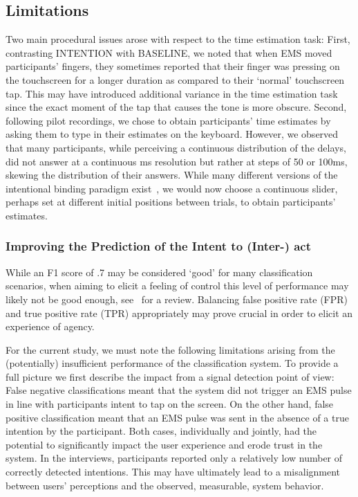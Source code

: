 \subsection{Limitations}
Two main procedural issues arose with respect to the time estimation task: First, contrasting INTENTION with BASELINE, we noted that when EMS moved participants' fingers, they sometimes reported that their finger was pressing on the touchscreen for a longer duration as compared to their `normal' touchscreen tap. This may have introduced additional variance in the time estimation task since the exact moment of the tap that causes the tone is more obscure. Second, following pilot recordings, we chose to obtain participants' time estimates by asking them to type in their estimates on the keyboard. However, we observed that many participants, while perceiving a continuous distribution of the delays, did not answer at a continuous ms resolution but rather at steps of 50 or 100ms, skewing the distribution of their answers. While many different versions of the intentional binding paradigm exist~\cite{Moore2012-dk}, we would now choose a continuous slider, perhaps set at different initial positions between trials, to obtain participants' estimates.

\subsubsection{Improving the Prediction of the Intent to (Inter-) act}
While an F1 score of .7 may be considered `good' for many classification scenarios, when aiming to elicit a feeling of control this level of performance may likely not be good enough, see~\citet{Papenmeier2022-oi} for a review. Balancing false positive rate (FPR) and true positive rate (TPR) appropriately may prove crucial in order to elicit an experience of agency.

For the current study, we must note the following limitations arising from the (potentially) insufficient performance of the classification system. To provide a full picture we first describe the impact from a signal detection point of view: False negative classifications meant that the system did not trigger an EMS pulse in line with participants intent to tap on the screen. On the other hand, false positive classification meant that an EMS pulse was sent in the absence of a true intention by the participant. Both cases, individually and jointly, had the potential to significantly impact the user experience and erode trust in the system. In the interviews, participants reported only a relatively low number of correctly detected intentions. This may have ultimately lead to a misalignment between users' perceptions and the observed, measurable, system behavior. 

